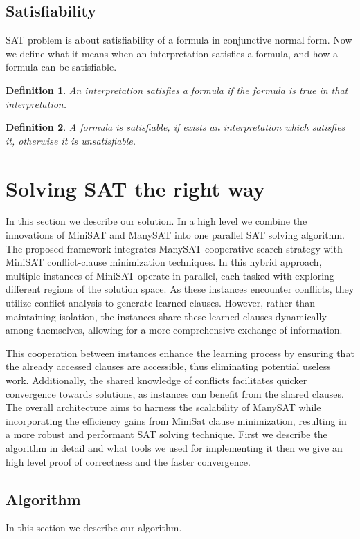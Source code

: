 \documentclass{article}
\newtheorem{definition}{Definition}
\begin{document}
\subsection{Satisfiability}
SAT problem is about satisfiability of a formula in conjunctive normal form. Now we define what it means when an interpretation satisfies a formula, and how a formula can be satisfiable.
\begin{definition}
An interpretation satisfies a formula if the formula is true in that interpretation.
\end{definition}
\begin{definition}
A formula is satisfiable, if exists an interpretation which satisfies it, otherwise it is unsatisfiable.
\end{definition}

\section{Solving SAT the right way}
\label{sec:methodology}

In this section we describe our solution. In a high level we combine the innovations of MiniSAT \cite{MiniSAT} and ManySAT \cite{ManySAT} into one parallel SAT solving algorithm. The proposed framework integrates ManySAT cooperative search strategy with MiniSAT conflict-clause minimization techniques. In this hybrid approach, multiple instances of MiniSAT operate in parallel, each tasked with exploring different regions of the solution space. As these instances encounter conflicts, they utilize conflict analysis to generate learned clauses. However, rather than maintaining isolation, the instances share these learned clauses dynamically among themselves, allowing for a more comprehensive exchange of information.

This cooperation between instances enhance the learning process by ensuring that the already accessed clauses are accessible, thus eliminating potential useless work. Additionally, the shared knowledge of conflicts facilitates quicker convergence towards solutions, as instances can benefit from the shared clauses. The overall architecture aims to harness the scalability of ManySAT while incorporating the efficiency gains from MiniSat clause minimization, resulting in a more robust and performant SAT solving technique. First we describe the algorithm in detail and what tools we used for implementing it then we give an high level proof of correctness and the faster convergence.

\subsection{Algorithm}
\label{subsec:algorithm}
In this section we describe our algorithm.
\end{document}
